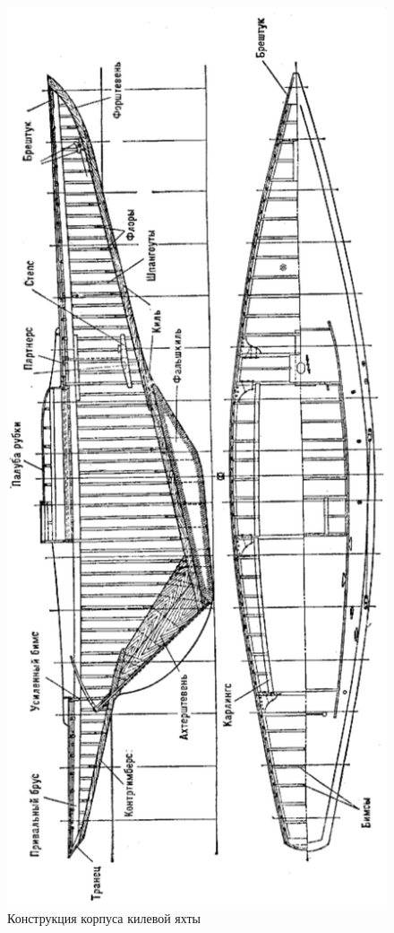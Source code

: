 \documentclass[a4paper, 12pt, twoside, final]{scrbook}
\begin{document}
\begin{figure}[htbp]
\centering
\includegraphics[scale=0.85]{Korpus_kilevoy_yakhty}
\protect\caption{\label{fig:25}Конструкция корпуса килевой яхты}
\end{figure}
\end{document}
